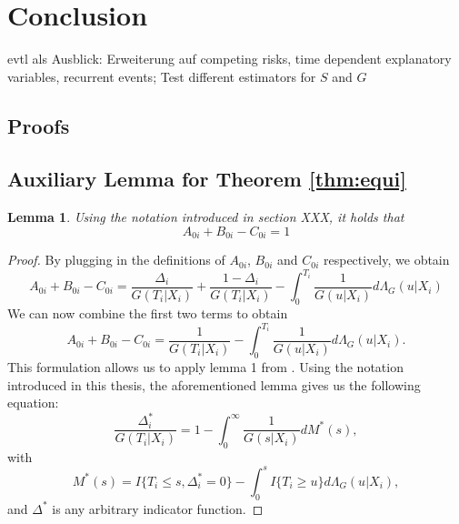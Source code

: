 \documentclass[12pt, a4paper]{article}
\theoremstyle{definition}
\theoremstyle{plain}
\newtheorem{Lemma}{Lemma}[section]
\numberwithin{equation}{section}
\numberwithin{figure}{section}
\numberwithin{table}{section}
\begin{document}
	\section{Conclusion}
	
	evtl als Ausblick: Erweiterung auf competing risks, time dependent explanatory variables, recurrent events; Test different estimators for $S$ and $G$
	
	\newpage
	
	\thispagestyle{empty}
	
	
	
	\newpage
	
	\begin{appendices}
		\section{Proofs}
		\subsection{Auxiliary Lemma for Theorem \ref{thm:equi}}\label{proof:strawderman}
		
		\begin{Lemma}\label{lem:equi}
			Using the notation introduced in section XXX, it holds that 
			\begin{equation*}
				A_{0i}+B_{0i}-C_{0i}=1
			\end{equation*}
		\end{Lemma}
		\begin{proof}
			By plugging in the definitions of $A_{0i}$, $B_{0i}$ and $C_{0i}$ respectively, we obtain
			\begin{equation*}
			A_{0i}+B_{0i}-C_{0i} = \frac{\Delta_i}{G(T_i\vert X_i)} + \frac{1-\Delta_i}{G(T_i\vert X_i)} - \int_{0}^{T_i}\frac{1}{G(u\vert X_i)}d\Lambda_G(u\vert X_i)
			\end{equation*}
			We can now combine the first two terms to obtain
			\begin{equation}\label{eq:lemma}
			A_{0i}+B_{0i}-C_{0i} = \frac{1}{G(T_i \vert X_i)} - \int_{0}^{T_i}\frac{1}{G(u\vert X_i)}d\Lambda_G(u\vert X_i).
			\end{equation}
			This formulation allows us to apply lemma 1 from \citet*{strawderman}.
			Using the notation introduced in this thesis, the aforementioned lemma gives us the following equation:
			\begin{equation}\label{eq:straw}
			\frac{\Delta^*_i}{G(T_i\vert X_i)} = 1 - \int_{0}^{\infty} \frac{1}{G(s\vert X_i)} dM^*(s),
			\end{equation}
			with
			\begin{equation*}
			M^*(s) = I\{T_i \leq s, \Delta^*_i=0\} - \int_{0}^s I\{T_i\geq u\}d\Lambda_G(u\vert X_i),
			\end{equation*}
			and $\Delta^*$ is any arbitrary indicator function.
			

\end{proof}
\end{appendices}
\end{document}
